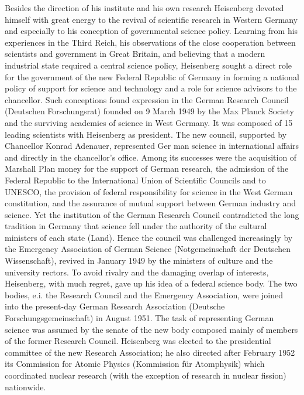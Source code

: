 \documentclass{article}
\begin{document}
Besides the direction of his institute and his own research Heisenberg devoted himself with great energy to the revival of scientific research in Western Germany and especially to his conception of governmental science policy. Learning from his experiences in the Third Reich, his observations of the close cooperation between scientists and government in Great Britain, and believing that a modern industrial state required a central science policy, Heisenberg sought a direct role for the government of the new Federal Republic of Germany in forming a national policy of support for science and technology and a role for science advisors to the chancellor. Such conceptions found expression in the German Research Council (Deutschen Forschungsrat) founded on 9 March 1949 by the Max Planck Society and the surviving academies of science in West Germany. It was composed of 15 leading scientists with Heisenberg as president. The new council, supported by Chancellor Konrad Adenauer, represented Ger man science in international affairs and directly in the chancellor's office. Among its successes were the acquisition of Marshall Plan money for the support of German research, the admission of the Federal Republic to the International Union of Scientific Councils and to UNESCO, the provision of federal responsibility for science in the West German constitution, and the assurance of mutual support between German industry and science. Yet the institution of the German Research Council contradicted the long tradition in Germany that science fell under the authority of the cultural ministers of each state (Land). Hence the council was challenged increasingly by the Emergency Association of German Science (Notgemeinschaft der Deutschen Wissenschaft), revived in January 1949 by the ministers of culture and the university rectors. To avoid rivalry and the damaging overlap of interests, Heisenberg, with much regret, gave up his idea of a federal science body. The two bodies, e.i. the Research Council and the Emergency Association, were joined into the present-day German Research Association (Deutsche Forschungsgemeinschaft) in August 1951. The task of representing German science was assumed by the senate of the new body composed mainly of members of the former Research Council. Heisenberg was elected to the presidential committee of the new Research Association; he also directed after February 1952 its Commission for Atomic Physics (Kommission für Atomphysik) which coordinated nuclear research (with the exception of research in nuclear fission) nationwide.
\end{document}

